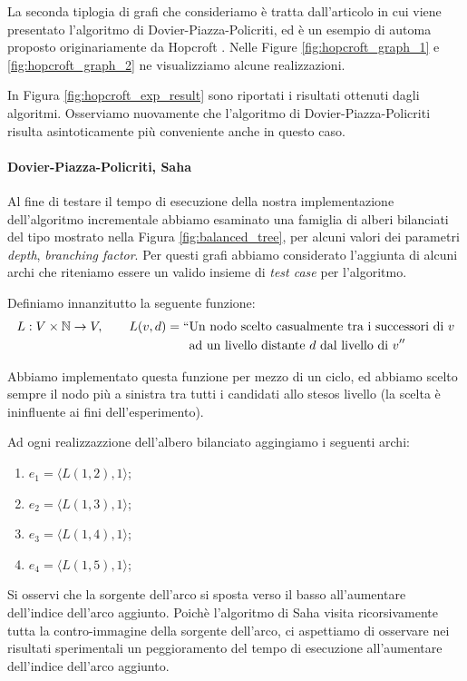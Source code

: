 La seconda tiplogia di grafi che consideriamo è tratta dall'articolo in cui viene presentato l'algoritmo di Dovier-Piazza-Policriti, ed è un esempio di automa proposto originariamente da Hopcroft \cite{hopcroft}. Nelle Figure \ref{fig:hopcroft_graph_1} e \ref{fig:hopcroft_graph_2} ne visualizziamo alcune realizzazioni.

In Figura \ref{fig:hopcroft_exp_result} sono riportati i risultati ottenuti dagli algoritmi. Osserviamo nuovamente che l'algoritmo di Dovier-Piazza-Policriti risulta asintoticamente più conveniente anche in questo caso.

\paragraph{Dovier-Piazza-Policriti, Saha} Al fine di testare il tempo di esecuzione della nostra implementazione dell'algoritmo incrementale abbiamo esaminato una famiglia di alberi bilanciati del tipo mostrato nella Figura \ref{fig:balanced_tree}, per alcuni valori dei parametri \emph{depth}, \emph{branching factor}. Per questi grafi abbiamo considerato l'aggiunta di alcuni archi che riteniamo essere un valido insieme di \emph{test case} per l'algoritmo.

Definiamo innanzitutto la seguente funzione:
\begin{align*}
    L: V \times \mathbb{N} \to V, \qquad L(v, d) = ``&\text{Un nodo scelto casualmente tra i successori di $v$}\\
    &\text{ad un livello distante $d$ dal livello di $v$}''
\end{align*}

Abbiamo implementato questa funzione per mezzo di un ciclo, ed abbiamo scelto sempre il nodo più a sinistra tra tutti i candidati allo stesos livello (la scelta è ininfluente ai fini dell'esperimento).

Ad ogni realizzazzione dell'albero bilanciato aggingiamo i seguenti archi:
\begin{enumerate}
    \item $e_1 = \langle L(1, 2), 1 \rangle$;
    \item $e_2 = \langle L(1, 3), 1 \rangle$;
    \item $e_3 = \langle L(1, 4), 1 \rangle$;
    \item $e_4 = \langle L(1, 5), 1 \rangle$;
\end{enumerate}

Si osservi che la sorgente dell'arco si sposta verso il basso all'aumentare dell'indice dell'arco aggiunto. Poichè l'algoritmo di Saha visita ricorsivamente tutta la contro-immagine della sorgente dell'arco, ci aspettiamo di osservare nei risultati sperimentali un peggioramento del tempo di esecuzione all'aumentare dell'indice dell'arco aggiunto.

